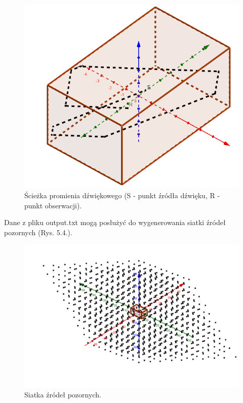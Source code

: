 \begin{figure}[H]
        \centering
                \centering
                \includegraphics[width=12cm]{rys10}
	\caption{Ścieżka promienia dźwiękowego (S - punkt źródła dźwięku, R - punkt obserwacji).}
\end{figure}

Dane z pliku output.txt mogą posłużyć do wygenerowania siatki źródeł pozornych (Rys. 5.4.).

\begin{figure}[H]
        \centering
                \centering
                \includegraphics[width=12cm]{rys11}
	\caption{Siatka źródeł pozornych.}
\end{figure}













